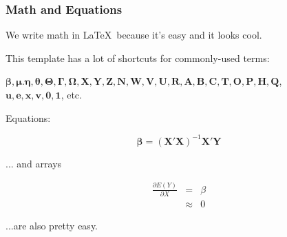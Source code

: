 \documentclass[10pt]{beamer}
\newcommand{\nin}{\noindent}
\newcommand{\non}{\nonumber}
\newcommand{\beq}{\begin{equation}}
\newcommand{\eeq}{\end{equation}}
\newcommand{\bea}{\begin{eqnarray}}
\newcommand{\eea}{\end{eqnarray}}
\newcommand{\+}{\item}
\newcommand{\?}{\item[$\cdot$]}
\newcommand{\X}{\mathbf{X}}
\newcommand{\Y}{\mathbf{Y}}
\newcommand{\Z}{\mathbf{Z}}
\newcommand{\N}{\mathbf{N}}
\newcommand{\V}{\mathbf{V}}
\newcommand{\W}{\mathbf{W}}
\newcommand{\U}{\mathbf{U}}
\newcommand{\R}{\mathbf{R}}
\newcommand{\A}{\mathbf{A}}
\newcommand{\B}{\mathbf{B}}
\newcommand{\C}{\mathbf{C}}
\newcommand{\T}{\mathbf{T}}
\renewcommand{\O}{\mathbf{O}}
\newcommand{\Q}{\mathbf{Q}}
\renewcommand{\P}{\mathbf{P}}
\renewcommand{\H}{\mathbf{H}}
\newcommand{\uu}{\mathbf{u}}
\newcommand{\E}{\mathbf{e}}
\newcommand{\x}{\mathbf{x}}
\newcommand{\vv}{\mathbf{v}}
\newcommand{\0}{\mathbf{0}}
\newcommand{\1}{\mathbf{1}}
\newcommand{\Beta}{\boldsymbol{\beta}}
\newcommand{\Mu}{\boldsymbol{\mu}}
\newcommand{\Eta}{\boldsymbol{\eta}}
\newcommand{\BTheta}{\boldsymbol{\theta}}
\newcommand{\THETA}{\boldsymbol{\Theta}}
\newcommand{\GAMMA}{\boldsymbol{\Gamma}}
\newcommand{\OMEGA}{\boldsymbol{\Omega}}
\begin{document}
\begin{frame}[fragile] \frametitle{Math and Equations}

\nin We write math in \LaTeX~because it's easy and it looks cool. \\

\medskip

\nin This template has a lot of shortcuts for commonly-used terms:  \\

\medskip

$\Beta, \Mu. \Eta, \BTheta, \THETA, \GAMMA, \OMEGA, \X, \Y, \Z, \N, \W, \V, \U, \R, \A, \B, \C, \T, \O, \P, \H, \Q$, \\
$\uu, \E, \x, \vv, \0, \1$, etc. \\

\medskip

\nin Equations:

\beq
\non \Beta = (\X'\X)^{-1}\X'\Y
\eeq

\nin ... and arrays

\bea
\non \frac{\partial E(Y)}{\partial X}      &=&       \beta \\
\non                                           &   \approx &  0
\eea

\nin ...are also pretty easy.


\end{frame}
\end{document}
